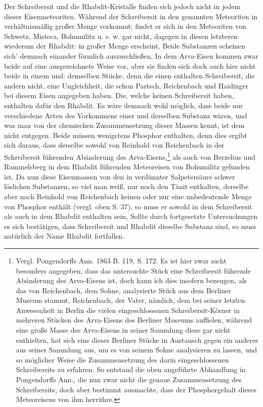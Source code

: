 \documentclass[a4paper, 11pt, oneside]{article}
\begin{document}
Der Schreibersit und die Rhabdit-Kristalle finden sich jedoch nicht in jedem dieser Eisenmeteoriten. Während der Schreibersit in den genannten Meteoriten in verhältnismäßig großer Menge vorkommt; findet er sich in den Meteoriten von Schwetz, Misteca, Bohumilitz u. s. w. gar nicht, dagegen in diesen letzteren wiederum der Rhabdit: in großer Menge erscheint, Beide Substanzen scheinen sich’ demnach einander förmlich auszuschließen, In dem Arva-Eisen kommen zwar beide auf eine ausgezeichnete Weise vor, aber sie finden sich doch auch hier nicht beide in einem und: demselben Stücke, denn die einen enthalten Schreibersit, die andern nicht, eine Ungleichheit, die schon Partsch, Reichenbach und Haidinger bei diesem Eisen angegeben haben. Die, welche keinen Schreibersit haben, enthalten dafür den Rhabdit. Es wäre demnach wohl möglich, dass beide nur verschiedene Arten des Vorkommens einer und derselben Substanz wären, und was man von der chemischen Zusammensetzung dieser Massen kennt, ist dem nicht entgegen. Beide müssen wenigstens Phosphor enthalten, denn dies ergibt sich daraus, dass derselbe sowohl von Reinhold von Reichenbach in der Schreibersit führenden Abänderung des Arva-Eisens,\footnote{Vergl. Pongendorffs Ann. 1863 B. 119, S. 172. Es ist hier zwar nicht besonders angegeben, dass das untersuchte Stück eine Schreibersit führende Abänderung des Arva-Eisens ist, doch kann ich dies insofern bezeugen, als das von Reichenbach, dem Sohne, analysierte Stück aus dem Berliner Museum stammt, Reichenbach, der Vater, nämlich, dem bei seiner letzten Anwesenheit in Berlin die vielen eingeschlossenen Schreibersit-Körner in mehreren Stücken des Arva-Eisens des Berliner Museums auffielen, während eine große Masse des Arva-Eisens in seiner Sammlung diese gar nicht enthielten, hat sich eins dieser Berliner Stücke in Austausch gegen ein anderes aus seiner Sammlung aus, um es von seinem Sohne analysieren zu lassen, und so möglicher Weise die Zusammensetzung des darin eingeschlossenen Schreibersits zu erfahren. So entstand die oben angeführte Abhandlung in Pongendorffs Ann., die nun zwar nicht die genaue Zusammensetzung des Schreibersits, doch aber bestimmt ausmachte, dass der Phosphorgehalt dieses Meteoreisens von ihm herrühre.} als auch von Berzelius und Rammelsberg in dem Rhabdit führenden Meteoreisen von Bohumilitz gefunden ist. Da nun diese Eisenmassen von den in verdünnter Salpetersäure schwer löslichen Substanzen, so viel man weiß, nur noch den Tänit enthalten, derselbe aber nach Reinhold von Reichenbach keinen oder nur eine unbedeutende Menge von Phosphor enthält (vergl. oben S. 37), so muss er sowohl in dem Schreibersit als auch in dem Rhabdit enthalten sein, Sollte durch fortgesetzte Untersuchungen es sich bestätigen, dass Schreibersit und Rhabdit dieselbe Substanz sind‚ so muss natürlich der Name Rhabdit fortfallen.
\end{document}
